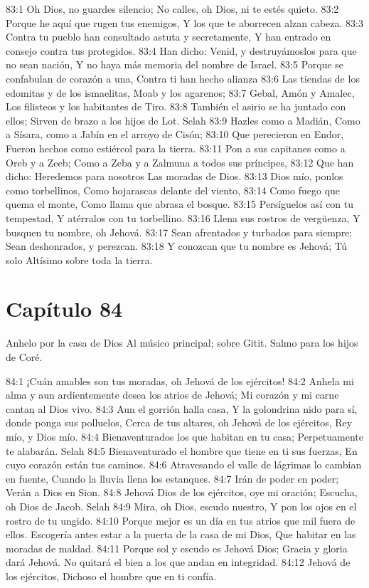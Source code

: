 83:1 Oh Dios, no guardes silencio; 
No calles, oh Dios, ni te estés quieto. 
83:2 Porque he aquí que rugen tus enemigos, 
Y los que te aborrecen alzan cabeza. 
83:3 Contra tu pueblo han consultado astuta y secretamente, 
Y han entrado en consejo contra tus protegidos. 
83:4 Han dicho: Venid, y destruyámoslos para que no sean nación, 
Y no haya más memoria del nombre de Israel. 
83:5 Porque se confabulan de corazón a una, 
Contra ti han hecho alianza 
83:6 Las tiendas de los edomitas y de los ismaelitas, 
Moab y los agarenos; 
83:7 Gebal, Amón y Amalec, 
Los filisteos y los habitantes de Tiro. 
83:8 También el asirio se ha juntado con ellos; 
Sirven de brazo a los hijos de Lot. Selah 
83:9 Hazles como a Madián, 
Como a Sísara, como a Jabín en el arroyo de Cisón; 
83:10 Que perecieron en Endor, 
Fueron hechos como estiércol para la tierra. 
83:11 Pon a sus capitanes como a Oreb y a Zeeb; 
Como a Zeba y a Zalmuna a todos sus príncipes, 
83:12 Que han dicho: Heredemos para nosotros 
Las moradas de Dios. 
83:13 Dios mío, ponlos como torbellinos, 
Como hojarascas delante del viento, 
83:14 Como fuego que quema el monte, 
Como llama que abrasa el bosque. 
83:15 Persíguelos así con tu tempestad, 
Y atérralos con tu torbellino. 
83:16 Llena sus rostros de vergüenza, 
Y busquen tu nombre, oh Jehová. 
83:17 Sean afrentados y turbados para siempre; 
Sean deshonrados, y perezcan. 
83:18 Y conozcan que tu nombre es Jehová; 
Tú solo Altísimo sobre toda la tierra. 
\section*{Capítulo 84}
Anhelo por la casa de Dios 
Al músico principal; sobre Gitit. Salmo para los hijos de Coré. 
 
84:1 ¡Cuán amables son tus moradas, oh Jehová de los ejércitos! 
84:2 Anhela mi alma y aun ardientemente desea los atrios de Jehová; 
Mi corazón y mi carne cantan al Dios vivo. 
84:3 Aun el gorrión halla casa, 
Y la golondrina nido para sí, donde ponga sus polluelos, 
Cerca de tus altares, oh Jehová de los ejércitos, 
Rey mío, y Dios mío. 
84:4 Bienaventurados los que habitan en tu casa; 
Perpetuamente te alabarán. Selah 
84:5 Bienaventurado el hombre que tiene en ti sus fuerzas, 
En cuyo corazón están tus caminos. 
84:6 Atravesando el valle de lágrimas lo cambian en fuente, 
Cuando la lluvia llena los estanques. 
84:7 Irán de poder en poder; 
Verán a Dios en Sion. 
84:8 Jehová Dios de los ejércitos, oye mi oración; 
Escucha, oh Dios de Jacob. Selah 
84:9 Mira, oh Dios, escudo nuestro, 
Y pon los ojos en el rostro de tu ungido. 
84:10 Porque mejor es un día en tus atrios que mil fuera de ellos. 
Escogería antes estar a la puerta de la casa de mi Dios, 
Que habitar en las moradas de maldad. 
84:11 Porque sol y escudo es Jehová Dios; 
Gracia y gloria dará Jehová. 
No quitará el bien a los que andan en integridad. 
84:12 Jehová de los ejércitos, 
Dichoso el hombre que en ti confía. 
